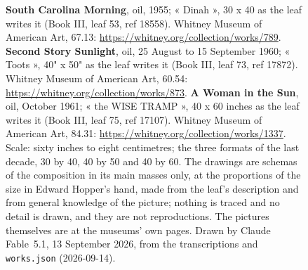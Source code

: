 \begin{figure}[htbp]
\caption{\textbf{South Carolina Morning}, oil, 1955; « Dinah », 30 x 40 as the leaf writes it (Book III, leaf 53, ref 18558). Whitney Museum of American Art, 67.13: \url{https://whitney.org/collection/works/789}. \textbf{Second Story Sunlight}, oil, 25 August to 15 September 1960; « Toots », 40" x 50" as the leaf writes it (Book III, leaf 73, ref 17872). Whitney Museum of American Art, 60.54: \url{https://whitney.org/collection/works/873}. \textbf{A Woman in the Sun}, oil, October 1961; « the WISE TRAMP », 40 x 60 inches as the leaf writes it (Book III, leaf 75, ref 17107). Whitney Museum of American Art, 84.31: \url{https://whitney.org/collection/works/1337}. Scale: sixty inches to eight centimetres; the three formats of the last decade, 30 by 40, 40 by 50 and 40 by 60. The drawings are schemas of the composition in its main masses only, at the proportions of the size in Edward Hopper's hand, made from the leaf's description and from general knowledge of the picture; nothing is traced and no detail is drawn, and they are not reproductions. The pictures themselves are at the museums' own pages. Drawn by Claude Fable~5.1, 13 September 2026, from the transcriptions and \texttt{works.json} (2026-09-14).}\label{fig:late}
\end{figure}
